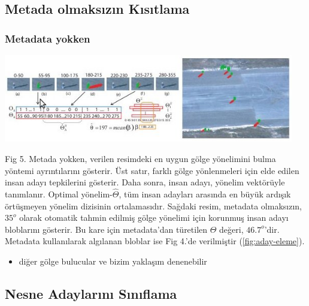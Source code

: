 \documentclass{beamer}
\begin{document}
\subsection{Metada olmaksızın Kısıtlama}

\begin{frame}
	\frametitle{Metadata yokken}

	\includegraphics[width=0.95\textwidth]{img/fig5.jpg}\label{fig:optimal-shadow-orientation}

	\begin{scriptsize}
		Fig 5. Metada yokken, verilen resimdeki en uygun gölge yönelimini bulma
		yöntemi ayrıntılarını gösterir. Üst satır, farklı gölge yönlenmeleri için
		elde edilen insan adayı tepkilerini gösterir. Daha sonra, insan adayı,
		yönelim vektörüyle tanımlanır. Optimal yönelim-$\hat{\Theta}$, tüm insan
		adayları arasında en büyük ardışık örtüşmeyen yönelim dizisinin
		ortalamasıdır. Sağdaki resim, metadata olmaksızın, $35^o$ olarak otomatik
		tahmin edilmiş gölge yönelimi için korunmuş insan adayı bloblarını gösterir.
		Bu kare için metadata'dan türetilen $\Theta$ değeri, $46.7^o$'dir. Metadata
		kullanılarak algılanan bloblar ise Fig 4.'de verilmiştir
		(\ref{fig:aday-eleme}).
	\end{scriptsize}

	\begin{itemize}
		\item diğer gölge bulucular ve bizim yaklaşım denenebilir
	\end{itemize}
\end{frame}

\subsection{Nesne Adaylarını Sınıflama}
\end{document}
